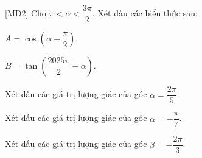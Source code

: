 \begin{bt}%
[MĐ2]%
	Cho $\pi<\alpha<\dfrac{3\pi}{2}$. Xét dấu các biểu thức sau:
	\begin{listEX}[2]
		\item $A=\cos\left(\alpha-\dfrac{\pi}{2}\right)$.
		\item $B=\tan\left(\dfrac{2025\pi}{2}-\alpha\right)$.
	\end{listEX}
\end{bt}

\begin{bt}%
	Xét dấu các giá trị lượng giác của góc $\alpha =\dfrac{2\pi}{5}$.
\end{bt}

\begin{bt}%
	Xét dấu các giá trị lượng giác của góc $\alpha =-\dfrac{\pi}{7}$.
\end{bt}

\begin{bt}%
	Xét dấu các giá trị lượng giác của góc $\beta =-\dfrac{2\pi}{3}$.
\end{bt}

